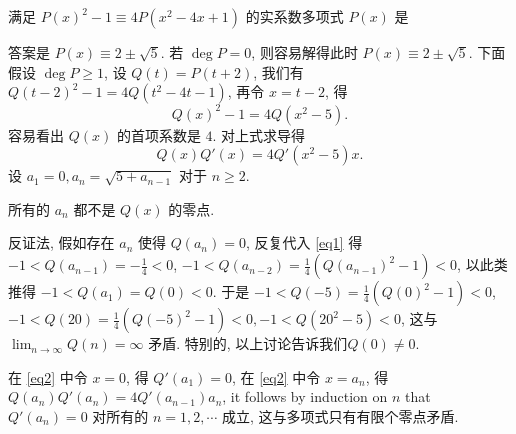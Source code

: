 \begin{prob}
\label{prob:prob-6}
满足 $P(x)^2 - 1 \equiv 4P(x^2 - 4x + 1)$ 的实系数多项式 $P(x)$ 是
\end{prob}

\begin{soln}
答案是 $\boxed{P(x)\equiv 2 \pm \sqrt{5}.}$
若 $\deg P = 0$, 则容易解得此时 $P(x)\equiv 2 \pm \sqrt{5}$.
下面假设 $\deg P \ge 1$, 设 $Q(t) = P(t + 2)$,
我们有 $Q(t - 2)^2 - 1 = 4Q(t^2 - 4t - 1)$,
再令 $x = t - 2$, 得
\begin{equation}
\label{eq1}
Q(x)^2 - 1 = 4Q(x^2 - 5).
\end{equation}
容易看出 $Q(x)$ 的首项系数是 $4$. 对上式求导得
\begin{equation}
\label{eq2}
Q(x)Q'(x) = 4Q'(x^2 - 5)x.
\end{equation}
设 $a_1 = 0, a_n = \sqrt{5 + a_{n-1}}$ 对于 $n \ge 2$.

\begin{claim}
所有的 $a_n$ 都不是 $Q(x)$ 的零点.
\end{claim}

\medskip

反证法, 假如存在 $a_n$ 使得 $Q(a_n) = 0$,
反复代入 \cref{eq1} 得 $-1 < Q(a_{n-1}) = -\frac{1}{4} < 0$,
$-1 < Q(a_{n-2}) = \frac{1}{4}(Q(a_{n-1})^2 - 1) < 0$,
以此类推得 $-1 < Q(a_1) = Q(0) < 0$.
于是 $-1 < Q(-5) = \frac{1}{4}(Q(0)^2 - 1) < 0$,
$-1 < Q(20) = \frac{1}{4}(Q(-5)^2 - 1) < 0, -1 < Q(20^2 - 5) < 0$,
这与 $\lim_{n \to \infty}Q(n) = \infty$ 矛盾.
特别的, 以上讨论告诉我们$Q(0) \ne 0$.

\bigskip

在 \cref{eq2} 中令 $x = 0$, 得 $Q'(a_1) = 0$,
在 \cref{eq2} 中令 $x = a_n$, 得 $Q(a_n)Q'(a_n) = 4Q'(a_{n-1})a_n$,
it follows by induction on $n$ that $Q'(a_n) = 0$ 对所有的 $n = 1, 2, \cdots$ 成立,
这与多项式只有有限个零点矛盾.
\end{soln}
